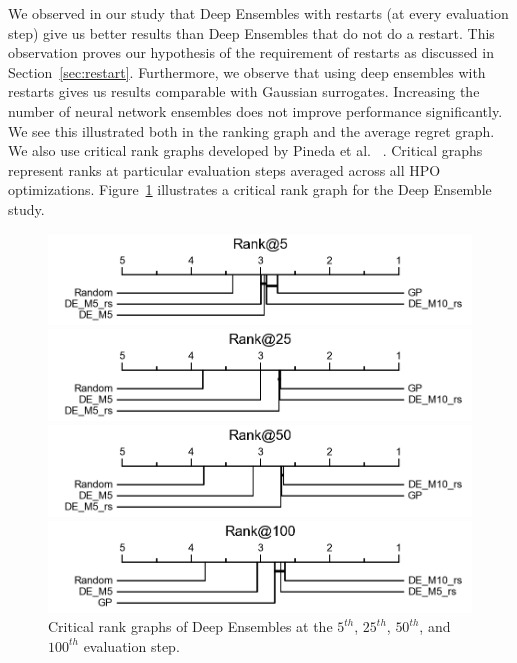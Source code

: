 \documentclass[12pt, twoside, ngerman]{report}
\begin{document}
We observed in our study that Deep Ensembles with restarts (at every evaluation step) give us better results than Deep Ensembles that do not do a restart.
This observation proves our hypothesis of the requirement of restarts as discussed in Section~\ref{sec:restart}.
Furthermore,  we observe that using deep ensembles with restarts gives us results comparable with Gaussian surrogates.
Increasing the number of neural network ensembles does not improve performance significantly.
We see this illustrated both in the ranking graph and the average regret graph.
We also use critical rank graphs developed by Pineda et al. ~\cite{pineda2021hpob}.
Critical graphs represent ranks at particular evaluation steps averaged across all HPO optimizations. 
Figure~\ref{fig:DERank100} illustrates a critical rank graph for the Deep Ensemble study.

\begin{figure}[h]%
\centering
\begin{minipage}{0.45\textwidth}
\includegraphics[width=\textwidth]{images/DERank5}
\end{minipage}\hfill
\begin{minipage}{0.45\textwidth}
\includegraphics[width=\textwidth]{images/DERank25}
\end{minipage}\par
\begin{minipage}{0.45\textwidth}
\includegraphics[width=\textwidth]{images/DERank50}
\end{minipage}\hfill
\begin{minipage}{0.45\textwidth}
\includegraphics[width=\textwidth]{images/DERank100}
\end{minipage}
    \caption{Critical rank graphs of Deep Ensembles at the $5^{th}$, $25^{th}$, $50^{th}$, and $100^{th}$ evaluation step.}
   \label{fig:DERank100}
\end{figure}
\end{document}
